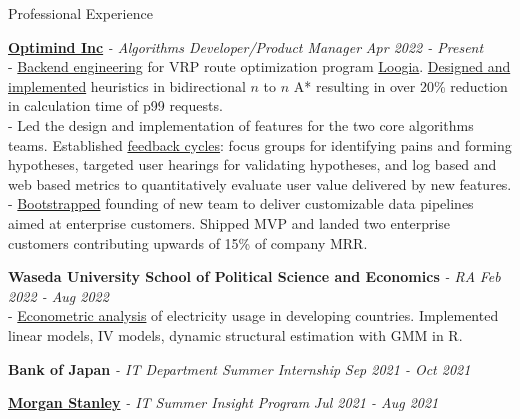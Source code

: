 \documentclass{resume} %
\begin{document}

\begin{rSection}{Professional Experience}

{\bf \href{https://www.optimind.tech/}{Optimind Inc}} {\textit{- Algorithms Developer/Product Manager }} \hfill {\em Apr 2022 - Present} 
\\- \uline{Backend engineering} for VRP route optimization program \href{https://loogia.jp/?_ga=2.72237267.1726635224.1669133714-1962149220.1665458028}{Loogia}. \uline{Designed and implemented} heuristics in bidirectional $n$ to $n$ A* resulting in over 20\% reduction in calculation time of p99 requests.
\\- Led the design and implementation of features for the two core algorithms teams. Established \uline{feedback cycles}: focus groups for identifying pains and forming hypotheses, targeted user hearings for validating hypotheses, and log based and web based metrics to quantitatively evaluate user value delivered by new features.
\\- \uline{Bootstrapped} founding of new team to deliver customizable data pipelines aimed at enterprise customers. Shipped MVP and landed two enterprise customers contributing upwards of 15\% of company MRR. 

{\bf Waseda University School of Political Science and Economics} {\textit{ - RA }} \hfill {\em Feb 2022 - Aug 2022} 
\\- \uline{Econometric analysis} of electricity usage in developing countries. Implemented linear models, IV models, dynamic structural estimation with GMM in R. 

{\bf Bank of Japan}{\textit{ - IT Department Summer Internship}} \hfill {\em Sep 2021 - Oct 2021} 

{\bf \href{https://www.morganstanley.co.jp/ja}{Morgan Stanley}}\textit{ - IT Summer Insight Program} \hfill {\em Jul 2021 - Aug 2021} 


\end{rSection}
\end{document}

